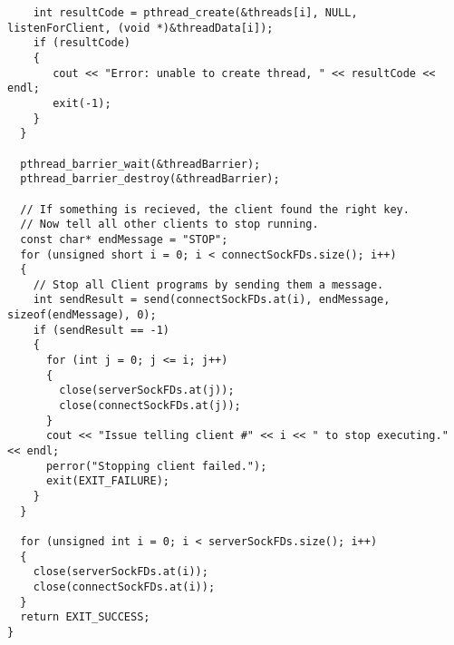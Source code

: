 \documentclass[11pt]{article}
\begin{document}
\begin{verbatim}
    int resultCode = pthread_create(&threads[i], NULL, listenForClient, (void *)&threadData[i]);
    if (resultCode)
    {
       cout << "Error: unable to create thread, " << resultCode << endl;
       exit(-1);
    }
  }

  pthread_barrier_wait(&threadBarrier);
  pthread_barrier_destroy(&threadBarrier);

  // If something is recieved, the client found the right key.
  // Now tell all other clients to stop running.
  const char* endMessage = "STOP";
  for (unsigned short i = 0; i < connectSockFDs.size(); i++)
  {
    // Stop all Client programs by sending them a message.
    int sendResult = send(connectSockFDs.at(i), endMessage, sizeof(endMessage), 0);
    if (sendResult == -1)
    {
      for (int j = 0; j <= i; j++)
      {
        close(serverSockFDs.at(j));
        close(connectSockFDs.at(j));
      }
      cout << "Issue telling client #" << i << " to stop executing." << endl;
      perror("Stopping client failed.");
      exit(EXIT_FAILURE);
    }
  }

  for (unsigned int i = 0; i < serverSockFDs.size(); i++)
  {
    close(serverSockFDs.at(i));
    close(connectSockFDs.at(i));
  }
  return EXIT_SUCCESS;
}

\end{verbatim}
\end{document}
